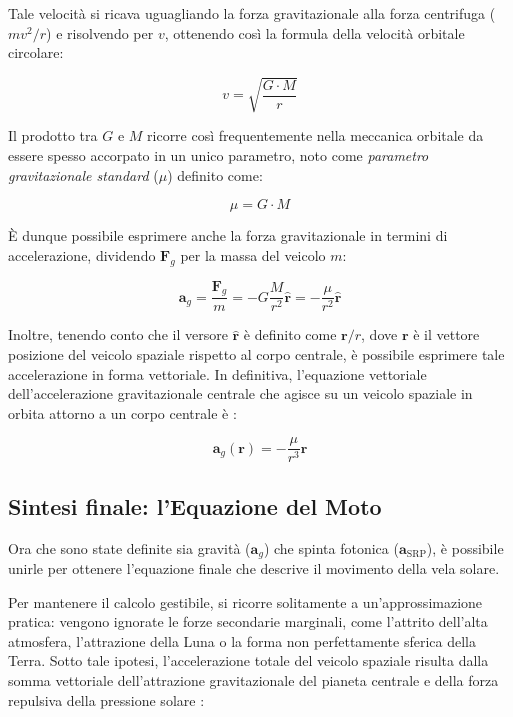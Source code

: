 Tale velocità si ricava uguagliando la forza gravitazionale alla forza centrifuga ($m v^2 / r$) e risolvendo per $v$, ottenendo così la formula della velocità orbitale circolare:

\begin{equation}
    v = \sqrt{\frac{G \cdot M}{r}}
\end{equation}

Il prodotto tra $G$ e $M$ ricorre così frequentemente nella meccanica orbitale da essere spesso accorpato in un unico parametro, noto come \textit{parametro gravitazionale standard} ($\mu$) definito come:

\begin{equation}
    \mu = G \cdot M
\end{equation}

È dunque possibile esprimere anche la forza gravitazionale in termini di accelerazione, dividendo $\mathbf{F}_g$ per la massa del veicolo $m$:

\begin{equation}
    \mathbf{a}_g = \frac{\mathbf{F}_g}{m} = - G \frac{M}{r^2} \mathbf{\hat{r}} = - \frac{\mu}{r^2} \mathbf{\hat{r}}
\end{equation}
 
Inoltre, tenendo conto che il versore $\mathbf{\hat{r}}$ è definito come $\mathbf{r}/r$, dove $\mathbf{r}$ è il vettore posizione del veicolo spaziale rispetto al corpo centrale, è possibile esprimere tale accelerazione in forma vettoriale.
In definitiva, l'equazione vettoriale dell'accelerazione gravitazionale centrale che agisce su un veicolo spaziale in orbita attorno a un corpo centrale è \cite{curtis2005orbital}:

\begin{equation}
    \mathbf{a}_g(\mathbf{r}) = - \frac{\mu}{r^3} \mathbf{r}
\end{equation}


\subsection{Sintesi finale: l'Equazione del Moto}
Ora che sono state definite sia gravità ($\mathbf{a}_g$) che spinta fotonica ($\mathbf{a}_{\text{SRP}}$), è possibile unirle per ottenere l'equazione finale che descrive il movimento della vela solare.

Per mantenere il calcolo gestibile, si ricorre solitamente a un'approssimazione pratica: vengono ignorate le forze secondarie marginali, come l'attrito dell'alta atmosfera, l'attrazione della Luna o la forma non perfettamente sferica della Terra. Sotto tale ipotesi, l'accelerazione totale del veicolo spaziale risulta dalla somma vettoriale dell'attrazione gravitazionale del pianeta centrale e della forza repulsiva della pressione solare \cite{mcinnes1999solar, simo2016realistic}:

